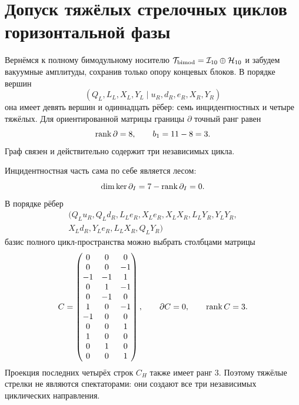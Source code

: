 \chapter{Допуск тяжёлых стрелочных циклов горизонтальной фазы}
\label{ch:v8-horizontal-phase-heavy-arrow-cycle-admission-gate}

Вернёмся к полному бимодульному носителю
$\mathcal T_{\rm bimod}=\mathcal I_{10}\oplus\mathcal H_{10}$ и забудем
вакуумные амплитуды, сохранив только опору концевых блоков. В порядке
вершин
\begin{equation}
 (Q_L,L_L,X_L,Y_L\mid u_R,d_R,e_R,X_R,Y_R)
 \label{eq:v8-heavy-cycle-vertices}
\end{equation}
она имеет девять вершин и одиннадцать рёбер: семь инцидентностных и четыре
тяжёлых. Для ориентированной матрицы границы $\partial$ точный ранг равен
\begin{equation}
 \operatorname{rank}\partial=8,
 \qquad
 b_1=11-8=3.
 \label{eq:v8-heavy-cycle-betti-rank}
\end{equation}
Граф связен и действительно содержит три независимых цикла.

Инцидентностная часть сама по себе является лесом:
\begin{equation}
 \dim\ker\partial_I=7-\operatorname{rank}\partial_I=0.
 \label{eq:v8-heavy-cycle-incidence-forest}
\end{equation}
В порядке рёбер
\begin{multline}
 (Q_Lu_R,Q_Ld_R,L_Le_R,X_Le_R,X_LX_R,L_LY_R,Y_LY_R,\\
 X_Ld_R,Y_Le_R,L_LX_R,Q_LY_R)
 \label{eq:v8-heavy-cycle-edge-order}
\end{multline}
базис полного цикл-пространства можно выбрать столбцами матрицы
\begin{equation}
 C=\begin{pmatrix}
0&0&0\\0&0&-1\\-1&-1&1\\0&1&-1\\0&-1&0\\
1&0&-1\\-1&0&0\\0&0&1\\1&0&0\\0&1&0\\0&0&1
\end{pmatrix},
 \qquad \partial C=0,
 \qquad \operatorname{rank} C=3.
 \label{eq:v8-heavy-cycle-basis}
\end{equation}
Проекция последних четырёх строк $C_H$ также имеет ранг $3$. Поэтому
тяжёлые стрелки не являются спектаторами: они создают все три независимых
циклических направления.

